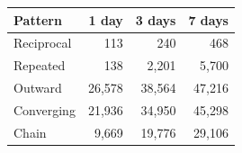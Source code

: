 \begin{tabular}{lrrr}
\toprule
Pattern & 1 day & 3 days & 7 days \\
\midrule
Reciprocal & 113 & 240 & 468 \\
Repeated & 138 & 2{,}201 & 5{,}700 \\
Outward & 26{,}578 & 38{,}564 & 47{,}216 \\
Converging & 21{,}936 & 34{,}950 & 45{,}298 \\
Chain & 9{,}669 & 19{,}776 & 29{,}106 \\
\bottomrule
\end{tabular}
